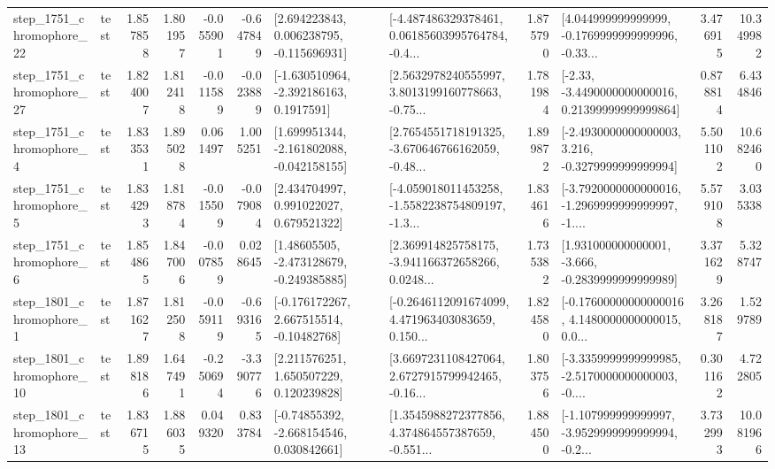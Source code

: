 \begin{tabular}{llrrrrllrlrr}
 step\_1751\_chromophore\_22 &      test &      1.857858 &    1.801957 &     -0.055901 & -0.647849 &    [2.694223843, 0.006238795, -0.115696931] &  [-4.487486329378461, 0.06185603995764784, -0.4... &       1.875790 &  [4.044999999999999, -0.1769999999999996, -0.33... &            3.476915 &         10.349982 \\
 step\_1751\_chromophore\_27 &      test &      1.824007 &    1.812418 &     -0.011589 & -0.023889 &     [-1.630510964, -2.392186163, 0.1917591] &  [2.5632978240555997, 3.8013199160778663, -0.75... &       1.781984 &  [-2.33, -3.4490000000000016, 0.21399999999999864] &            0.878814 &          6.434846 \\
  step\_1751\_chromophore\_4 &      test &      1.833531 &    1.895028 &      0.061497 &  1.005251 &   [1.699951344, -2.161802088, -0.042158155] &  [2.7654551718191325, -3.670646766162059, -0.48... &       1.899872 &  [-2.4930000000000003, 3.216, -0.3279999999999994] &            5.501102 &         10.682460 \\
  step\_1751\_chromophore\_5 &      test &      1.834293 &    1.818784 &     -0.015509 & -0.079084 &     [2.434704997, 0.991022027, 0.679521322] &  [-4.059018011453258, -1.5582238754809197, -1.3... &       1.834616 &  [-3.7920000000000016, -1.2969999999999997, -1.... &            5.579108 &          3.035338 \\
  step\_1751\_chromophore\_6 &      test &      1.854865 &    1.847006 &     -0.007859 &  0.028645 &    [1.48605505, -2.473128679, -0.249385885] &  [2.369914825758175, -3.941166372658266, 0.0248... &       1.735382 &   [1.931000000000001, -3.666, -0.2839999999999989] &            3.371629 &          5.328747 \\
  step\_1801\_chromophore\_1 &      test &      1.871627 &    1.812508 &     -0.059119 & -0.693165 &    [-0.176172267, 2.667515514, -0.10482768] &  [-0.2646112091674099, 4.471963403083659, 0.150... &       1.824580 &  [-0.17600000000000016, 4.1480000000000015, 0.0... &            3.268187 &          1.529789 \\
 step\_1801\_chromophore\_10 &      test &      1.898186 &    1.647491 &     -0.250694 & -3.390776 &     [2.211576251, 1.650507229, 0.120239828] &  [3.6697231108427064, 2.6727915799942465, -0.16... &       1.803756 &  [-3.3359999999999985, -2.5170000000000003, -0.... &            0.301162 &          4.722805 \\
 step\_1801\_chromophore\_13 &      test &      1.836715 &    1.886035 &      0.049320 &  0.833784 &    [-0.74855392, -2.668154546, 0.030842661] &  [1.3545988272377856, 4.374864557387659, -0.551... &       1.884500 &  [-1.107999999999997, -3.9529999999999994, -0.2... &            3.732993 &         10.081966 \\

\end{tabular}
